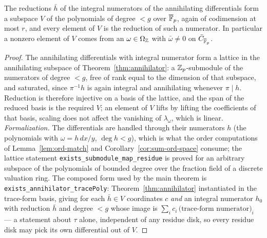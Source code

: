 \begin{lemma}
\label{lem:normalize}
\leanok
{}
The reductions $\bar h$ of the integral numerators of the annihilating differentials form
a subspace $V$ of the polynomials of degree $< g$ over $\overline{\mathbb{F}}_p$, again of codimension at
most $r$, and every element of $V$ is the reduction of such a numerator. In particular a
nonzero element of $V$ comes from an $\omega \in \Omega_{\mathbb{Z}}$ with $\bar\omega \ne 0$
on $\bar C_{\overline{\mathbb{F}}_p}$.
\end{lemma}
\begin{proof}
\leanok
The annihilating differentials with integral numerator form a lattice in the annihilating
subspace of Theorem~\ref{thm:annihilator}: a $\mathbb{Z}_p$-submodule of the numerators of degree
$< g$, free of rank equal to the dimension of that subspace, and saturated, since
$\pi^{-1}h$ is again integral and annihilating whenever $\pi \mid h$. Reduction is
therefore injective on a basis of the lattice, and the span of the reduced basis is the
required $V$; an element of $V$ lifts by lifting the coefficients of that basis, scaling
does not affect the vanishing of $\lambda_\omega$, which is linear.
\emph{Formalization.} The differentials are handled through their numerators $h$ (the
polynomials with $\omega = h\,dx/y$, $\deg h < g$), which is what the order computations
of Lemma~\ref{lem:ord-match} and Corollary~\ref{cor:sum-ord-space} consume; the lattice
statement \texttt{exists\_submodule\_map\_residue} is proved for an arbitrary subspace of
the polynomials of bounded degree over the fraction field of a discrete valuation ring.
The composed form used by the main theorem is \texttt{exists\_annihilator\_tracePoly}:
Theorem~\ref{thm:annihilator} instantiated in the trace-form basis, giving for each
$\bar h \in V$ coordinates $c$ \emph{and} an integral numerator $h_0$ with reduction
$\bar h$ and degree $< g$ whose image is
$\sum_i c_i\,\bigl(\text{trace-form numerator}\bigr)_i$ --- a statement about $\tau$
alone, independent of any residue disk, so every residue disk may pick its own
differential out of $V$.
\end{proof}

